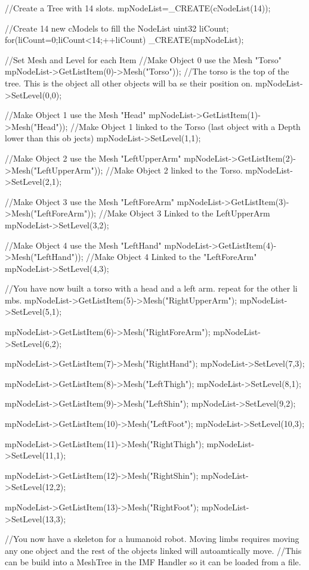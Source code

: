 \begin{DoxyCode}
 //Create a Tree with 14 slots.
 mpNodeList=_CREATE(cNodeList(14));

 //Create 14 new cModels to fill the NodeList
 uint32 liCount;
 for(liCount=0;liCount<14;++liCount)
 {
        _CREATE(mpNodeList);
 }

 //Set Mesh and Level for each Item
 //Make Object 0 use the Mesh "Torso"
 mpNodeList->GetListItem(0)->Mesh("Torso"));
 //The torso is the top of the tree. This is the object all other objects will ba
      se their position on.
 mpNodeList->SetLevel(0,0);

 //Make Object 1 use the Mesh "Head"
 mpNodeList->GetListItem(1)->Mesh("Head"));
 //Make Object 1 linked to the Torso (last object with a Depth lower than this ob
      jects)
 mpNodeList->SetLevel(1,1);

 //Make Object 2 use the Mesh "LeftUpperArm"
 mpNodeList->GetListItem(2)->Mesh("LeftUpperArm"));
 //Make Object 2 linked to the Torso.
 mpNodeList->SetLevel(2,1);

 //Make Object 3 use the Mesh "LeftForeArm"
 mpNodeList->GetListItem(3)->Mesh("LeftForeArm"));
 //Make Object 3 Linked to the LeftUpperArm
 mpNodeList->SetLevel(3,2);

 //Make Object 4 use the Mesh "LeftHand"
 mpNodeList->GetListItem(4)->Mesh("LeftHand"));
 //Make Object 4 Linked to the "LeftForeArm"
 mpNodeList->SetLevel(4,3);

 //You have now built a torso with a head and a left arm. repeat for the other li
      mbs.
 mpNodeList->GetListItem(5)->Mesh("RightUpperArm");
 mpNodeList->SetLevel(5,1);

 mpNodeList->GetListItem(6)->Mesh("RightForeArm");
 mpNodeList->SetLevel(6,2);

 mpNodeList->GetListItem(7)->Mesh("RightHand");
 mpNodeList->SetLevel(7,3);

 mpNodeList->GetListItem(8)->Mesh("LeftThigh");
 mpNodeList->SetLevel(8,1);

 mpNodeList->GetListItem(9)->Mesh("LeftShin");
 mpNodeList->SetLevel(9,2);

 mpNodeList->GetListItem(10)->Mesh("LeftFoot");
 mpNodeList->SetLevel(10,3);

 mpNodeList->GetListItem(11)->Mesh("RightThigh");
 mpNodeList->SetLevel(11,1);

 mpNodeList->GetListItem(12)->Mesh("RightShin");
 mpNodeList->SetLevel(12,2);

 mpNodeList->GetListItem(13)->Mesh("RightFoot");
 mpNodeList->SetLevel(13,3);

 //You now have a skeleton for a humanoid robot. Moving limbs requires moving any
       one object and the rest of the objects linked will autoamtically move.
 //This can be build into a MeshTree in the IMF Handler so it can be loaded from 
      a file.
\end{DoxyCode}
